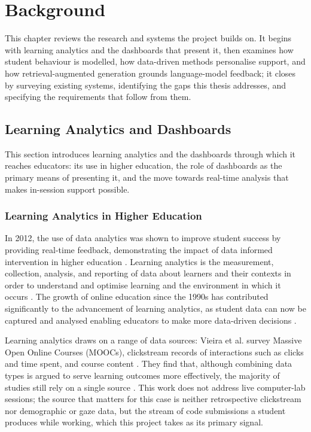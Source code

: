 \section{Background} \label{sec:requirements}

This chapter reviews the research and systems the project builds on. It begins with learning analytics and the dashboards that present it, then examines how student behaviour is modelled, how data-driven methods personalise support, and how retrieval-augmented generation grounds language-model feedback; it closes by surveying existing systems, identifying the gaps this thesis addresses, and specifying the requirements that follow from them.

\subsection{Learning Analytics and Dashboards}

This section introduces learning analytics and the dashboards through which it reaches educators: its use in higher education, the role of dashboards as the primary means of presenting it, and the move towards real-time analysis that makes in-session support possible.

\subsubsection{Learning Analytics in Higher Education}



In 2012, the use of data analytics was shown to improve student success by providing real-time feedback, demonstrating the impact of data informed intervention in higher education \cite{nguyen_2020_data,hattiePowerFeedback2007,blackAssessmentClassroomLearning1998}.
Learning analytics is the measurement, collection, analysis, and reporting of data about learners and their contexts in order to understand and optimise learning and the environment in which it occurs \cite{wikipediacontributors_2019_learning_analytics,nguyen_2020_data,siemensLearningAnalyticsEmergence2013,clowOverviewLearningAnalytics2013}. 
The growth of online education since the 1990s has contributed significantly to the advancement of learning analytics, as student data can now be captured and analysed enabling educators to make more data-driven decisions \cite{nguyen_2020_data,vieira_2018_visual,romeroEducationalDataMining2020}. 

Learning analytics draws on a range of data sources: Vieira et al. survey Massive Open Online Courses (MOOCs), clickstream records of interactions such as clicks and time spent, and course content \cite{vieira_2018_visual}. They find that, although combining data types is argued to serve learning outcomes more effectively, the majority of studies still rely on a single source \cite{vieira_2018_visual}. This work does not address live computer-lab sessions; the source that matters for this case is neither retrospective clickstream nor demographic or gaze data, but the stream of code submissions a student produces while working, which this project takes as its primary signal.

